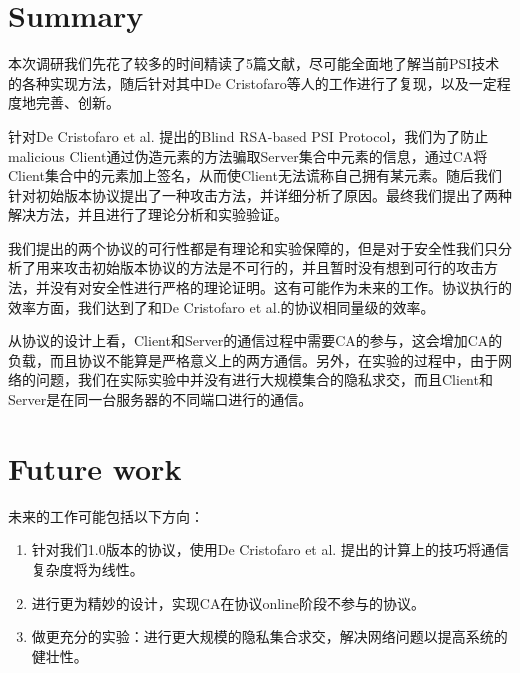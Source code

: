 \section{Summary}
本次调研我们先花了较多的时间精读了5篇文献，尽可能全面地了解当前PSI技术的各种实现方法，随后针对其中De Cristofaro等人的工作\cite{de2010practical}进行了复现，以及一定程度地完善、创新。

针对De Cristofaro et al. 提出的Blind RSA-based PSI Protocol，我们为了防止malicious Client通过伪造元素的方法骗取Server集合中元素的信息，通过CA将Client集合中的元素加上签名，从而使Client无法谎称自己拥有某元素。随后我们针对初始版本协议提出了一种攻击方法，并详细分析了原因。最终我们提出了两种解决方法，并且进行了理论分析和实验验证。

我们提出的两个协议的可行性都是有理论和实验保障的，但是对于安全性我们只分析了用来攻击初始版本协议的方法是不可行的，并且暂时没有想到可行的攻击方法，并没有对安全性进行严格的理论证明。这有可能作为未来的工作。协议执行的效率方面，我们达到了和De Cristofaro et al.的协议相同量级的效率。

从协议的设计上看，Client和Server的通信过程中需要CA的参与，这会增加CA的负载，而且协议不能算是严格意义上的两方通信。另外，在实验的过程中，由于网络的问题，我们在实际实验中并没有进行大规模集合的隐私求交，而且Client和Server是在同一台服务器的不同端口进行的通信。

\section{Future work}
\noindent 未来的工作可能包括以下方向：
\begin{enumerate}
    \item 针对我们1.0版本的协议，使用De Cristofaro et al. 提出的计算上的技巧将通信复杂度将为线性。
    \item 进行更为精妙的设计，实现CA在协议online阶段不参与的协议。
    \item 做更充分的实验：进行更大规模的隐私集合求交，解决网络问题以提高系统的健壮性。
\end{enumerate}
